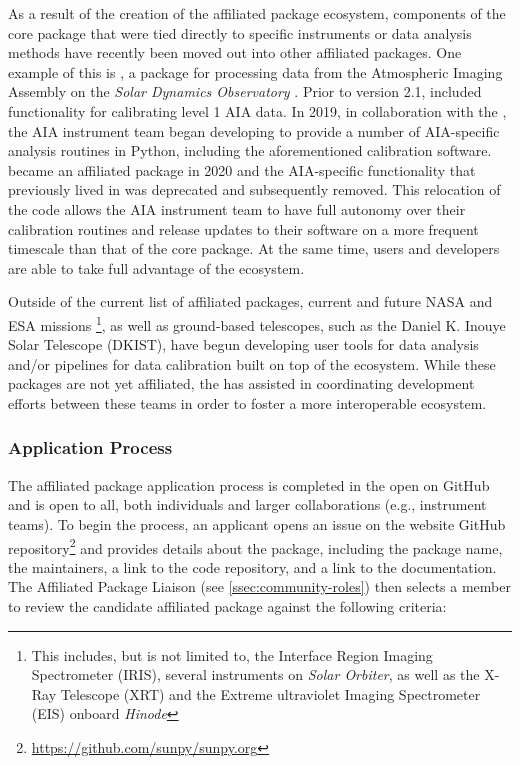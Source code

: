 As a result of the creation of the affiliated package ecosystem, components of the \sunpypkg core package that were tied directly to specific instruments or data analysis methods have recently been moved out into other affiliated packages.
One example of this is \aiapypkg \citep{barnes_aiapy_2020}, a package for processing data from the Atmospheric Imaging Assembly \citep[AIA,][]{lemen_atmospheric_2012} on the \textit{Solar Dynamics Observatory} \citep[SDO,][]{pesnell_solar_2012}.
Prior to version 2.1, \sunpypkg included functionality for calibrating level 1 AIA data.
In 2019, in collaboration with the \sunpyproj, the AIA instrument team began developing \aiapypkg to provide a number of AIA-specific analysis routines in Python, including the aforementioned calibration software.
\aiapypkg became an affiliated package in 2020 and the AIA-specific functionality that previously lived in \sunpypkg was deprecated and subsequently removed.
This relocation of the code allows the AIA instrument team to have full autonomy over their calibration routines and release updates to their software on a more frequent timescale than that of the \sunpypkg core package.
At the same time, \aiapypkg users and developers are able to take full advantage of the \sunpyproj ecosystem.

Outside of the current list of affiliated packages, current and future NASA and ESA missions \footnote{This includes, but is not limited to, the Interface Region Imaging Spectrometer (IRIS), several instruments on \textit{Solar Orbiter}, as well as the X-Ray Telescope (XRT) and the Extreme ultraviolet Imaging Spectrometer (EIS) onboard \textit{Hinode}}, as well as ground-based telescopes, such as the Daniel K. Inouye Solar Telescope (DKIST), have begun developing user tools for data analysis and/or pipelines for data calibration built on top of the \sunpy ecosystem.
While these packages are not yet affiliated, the \sunpyproj has assisted in coordinating development efforts between these teams in order to foster a more interoperable ecosystem.

\subsubsection{Application Process}
\label{sssec:application-process}

The affiliated package application process is completed in the open on GitHub and is open to all, both individuals and larger collaborations (e.g., instrument teams).
To begin the process, an applicant opens an issue on the \sunpyproj website GitHub repository\footnote{\url{https://github.com/sunpy/sunpy.org}} and provides details about the package, including the package name, the maintainers, a link to the code repository, and a link to the documentation.
The Affiliated Package Liaison (see \autoref{ssec:community-roles}) then selects a \sunpyproj member to review the candidate affiliated package against the following criteria:


